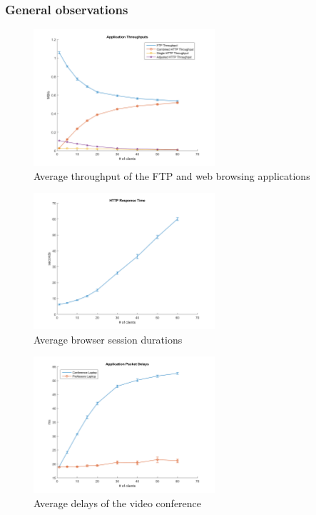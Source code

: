\documentclass[
10pt, %
a4paper, %
oneside, %
headinclude,footinclude, %
BCOR5mm, %
]{scrartcl}
\begin{document}
\subsubsection{General observations}
\begin{figure}[!ht]
  \centering
  \includegraphics[width=0.6\textwidth]{Figures/nocctv/Application_Throughputs.png}
  \caption{Average throughput of the FTP and web browsing applications} \label{fig:app_throughput}
\end{figure}
\begin{figure}[!ht]
  \centering
  \includegraphics[width=0.6\textwidth]{Figures/nocctv/HTTP_Response_Time.png}
  \caption{Average browser session durations} \label{fig:browser_sess_dur}
\end{figure}
\begin{figure}[!ht]
  \centering
  \includegraphics[width=0.6\textwidth]{Figures/nocctv/Application_Packet_Delays.png}
  \caption{Average delays of the video conference} \label{fig:app_pkt_delay}
\end{figure}
\end{document}
